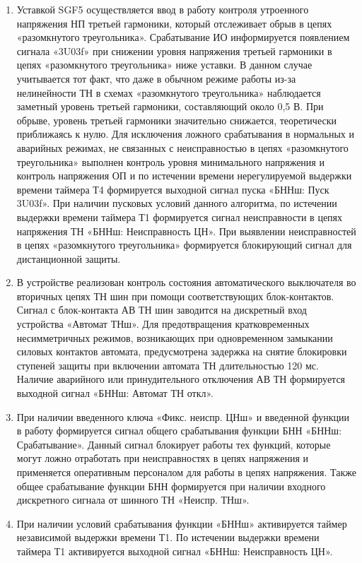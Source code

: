 \begin{enumerate}
\item
Уставкой SGF5 осуществляется ввод в работу контроля утроенного напряжения НП третьей гармоники, который отслеживает обрыв в цепях «разомкнутого треугольника». Срабатывание ИО информируется появлением сигнала «3U03f» при снижении уровня напряжения третьей гармоники в цепях «разомкнутого треугольника» ниже уставки. В данном случае учитывается тот факт, что даже в обычном режиме работы из-за нелинейности ТН в схемах «разомкнутого треугольника» наблюдается заметный уровень третьей гармоники, составляющий около 0,5 В. При обрыве, уровень третьей гармоники значительно снижается, теоретически приближаясь к нулю. Для исключения ложного срабатывания в нормальных и аварийных режимах, не связанных с неисправностью в цепях «разомкнутого треугольника» выполнен контроль уровня минимального напряжения и контроль напряжения ОП и по истечении времени нерегулируемой выдержки времени таймера Т4 формируется выходной сигнал пуска «БННш: Пуск 3U03f». При наличии пусковых условий данного алгоритма, по истечении выдержки времени таймера Т1 формируется сигнал неисправности в цепях напряжения ТН «БННш: Неисправность ЦН». При выявлении неисправностей в цепях «разомкнутого треугольника» формируется блокирующий сигнал для дистанционной защиты.

\item
В устройстве реализован контроль состояния автоматического выключателя во вторичных цепях ТН шин при помощи соответствующих блок-контактов. Сигнал с блок-контакта АВ ТН шин заводится на дискретный вход устройства «Автомат ТНш». Для предотвращения кратковременных несимметричных режимов, возникающих при одновременном замыкании силовых контактов автомата, предусмотрена задержка на снятие блокировки ступеней защиты при включении автомата ТН длительностью 120 мс. Наличие аварийного или принудительного отключения АВ ТН формируется выходной сигнал «БННш: Автомат ТН откл».

\item
При наличии введенного ключа «Фикс. неиспр. ЦНш» и введенной функции в работу формируется сигнал общего срабатывания функции БНН «БННш: Срабатывание». Данный сигнал блокирует работы тех функций, которые могут ложно отработать при неисправностях в цепях напряжения и применяется оперативным персоналом для работы в цепях напряжения. Также общее срабатывание функции БНН формируется при наличии входного дискретного сигнала от шинного ТН «Неиспр. ТНш».

\item
При наличии условий срабатывания функции «БННш» активируется таймер независимой выдержки времени Т1. По истечении выдержки времени таймера Т1 активируется выходной сигнал «БННш: Неисправность ЦН».


\end{enumerate}
